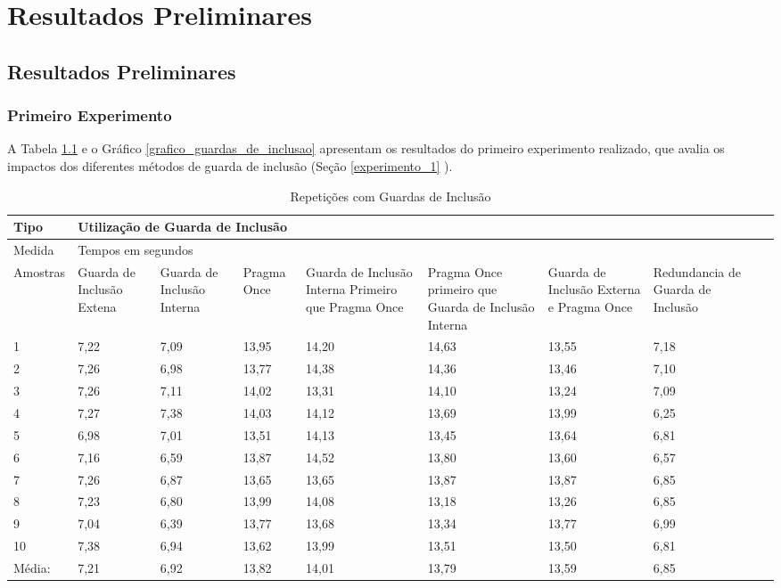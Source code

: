 \part{Resultados Preliminares}

\chapter[Resultados Preliminares]{Resultados Preliminares}


\section{Primeiro Experimento}

A Tabela \ref{tab:tabela_guarda_de_inclusao} e o Gráfico 
\ref{grafico_guardas_de_inclusao} apresentam os resultados
 do primeiro experimento realizado, que avalia os impactos
 dos diferentes métodos de guarda de inclusão (Seção \ref{experimento_1} ).


\begin{table}[h]
\centering
\begin{tabular}{|l|p{1.5cm}|p{1.5cm}|p{1.5cm}|p{1.5cm}|p{2cm}|p{2cm}|p{2cm}|p{2cm}|}
\hline
Tipo & \multicolumn{7}{l|}{Utilização de Guarda de Inclusão} \\ \hline
Medida & \multicolumn{7}{l|}{Tempos em segundos } \\ \hline
Amostras & Guarda de Inclusão Extena & Guarda de Inclusão Interna & Pragma Once & Guarda de Inclusão Interna Primeiro que Pragma Once & Pragma Once primeiro que Guarda de Inclusão Interna & Guarda de Inclusão Externa e Pragma Once & Redundancia de Guarda de Inclusão \\ \hline
 1  & 7,22 & 7,09 & 13,95  &  14,20 &14,63   &  13,55 &  7,18  \\ \hline
 2  & 7,26 & 6,98 & 13,77  &  14,38 & 14,36  &  13,46 & 7,10   \\ \hline
 3  & 7,26 & 7,11 & 14,02  &  13,31 & 14,10  &  13,24 &7,09    \\ \hline
 4  & 7,27 & 7,38 & 14,03  &  14,12 & 13,69  &  13,99 &6,25    \\ \hline
 5  & 6,98 & 7,01 & 13,51  &  14,13 & 13,45  &  13,64 &6,81    \\ \hline
 6  & 7,16 & 6,59 & 13,87  &  14,52 & 13,80  &  13,60 &6,57    \\ \hline
 7  & 7,26 & 6,87 & 13,65  &  13,65 & 13,87  &  13,87 &6,85    \\ \hline 
 8  & 7,23 & 6,80 & 13,99  &  14,08 & 13,18  &  13,26 &6,85    \\ \hline
 9  & 7,04 & 6,39 & 13,77  &  13,68 & 13,34  &  13,77 &6,99    \\ \hline
 10 & 7,38 & 6,94 & 13,62  &  13,99 & 13,51  &  13,50 &6,81    \\ \hline
 Média: & 7,21 & 6,92 & 13,82& 14,01& 13,79  &  13,59 &6,85    \\ \hline
\end{tabular}
\caption{Repetições com Guardas de Inclusão}
\label{tab:tabela_guarda_de_inclusao}
\end{table}

